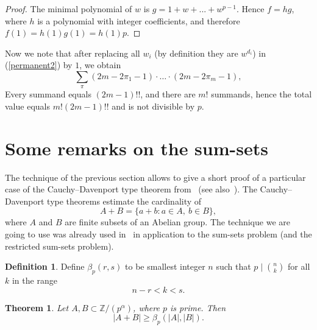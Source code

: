 \documentclass[12pt,a4paper]{amsart}
\newtheorem{thm}{Theorem}
\theoremstyle{definition}
\newtheorem{defn}{Definition}
\theoremstyle{remark}
\begin{document}
\begin{proof}
The minimal polynomial of $w$ is $g = 1+w+...+w^{p-1}$. Hence $f=hg$, where $h$ is a polynomial with integer coefficients, and therefore $f(1) = h(1) g(1) = h(1)p$.
\end{proof}

Now we note that after replacing all $w_i$ (by definition they are $w^{d_i}$) in (\ref{permanent2}) by $1$, we obtain 
$$
\sum_\pi (2m-2\pi_1 - 1)\cdot \dots \cdot (2m-2\pi_m-1),
$$
Every summand equals $(2m-1)!!$, and there are $m!$ summands, hence the total value equals $m!(2m-1)!!$ and is not divisible by $p$.

\section{Some remarks on the sum-sets}
\label{cau-dav-sec}

The technique of the previous section allows to give a short proof of a particular case of the Cauchy--Davenport type theorem from~\cite{bole1996,ekp2003} (see also~\cite{cau1813,dav1935,eliker1998,alon1999,kar2004}). The Cauchy--Davenport type theorems estimate the cardinality of 
$$
A+B = \{a + b : a\in A,\ b\in B\},
$$
where $A$ and $B$ are finite subsets of an Abelian group. The technique we are going to use was already used in~\cite{kar2004} in application to the sum-sets problem (and the restricted sum-sets problem).

\begin{defn}
Define $\beta_p(r,s)$ to be smallest integer $n$ such that $p\mid \binom{n}{k}$ for all $k$ in the range
$$
n-r < k < s.
$$
\end{defn}

\begin{thm}
\label{cau-dav-pk}
Let $A, B\subset \mathbb Z/(p^\alpha)$, where $p$ is prime. Then 
$$
|A+B|\ge \beta_p(|A|, |B|).
$$
\end{thm}
\end{document}
